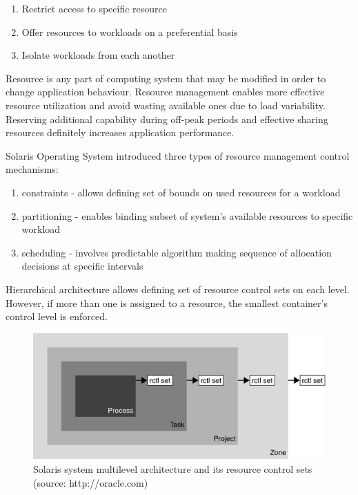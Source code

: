 \documentclass[11pt]{book}
\begin{document}
      \begin{enumerate}
        \item Restrict access to specific resource
        \item Offer resources to workloads on a preferential basis
        \item Isolate workloads from each another
      \end{enumerate}
	
      Resource is any part of computing system that may be modified in order to change application behaviour. Resource
      management enables more effective resource utilization and avoid wasting available ones due to load variability.
      Reserving additional capability during off-peak periods and effective sharing resources definitely increases
      application performance.
      
      Solaris Operating System introduced three types of resource management control mechanisms:

      \begin{enumerate}
        \item constraints - allows defining set of bounds on used resources for a workload
        \item partitioning - enables binding subset of system's available resources to specific workload
        \item scheduling - involves predictable algorithm making sequence of allocation decisions at specific intervals
      \end{enumerate}

      Hierarchical architecture allows defining set of resource control sets on each level. However, if more than one is
      assigned to a resource, the smallest container's control level is enforced. 

      \begin{figure}[H]
        \includegraphics[width=\textwidth]{img/rctrl.png}
        \caption{Solaris system multilevel architecture and its resource control sets (source: http://oracle.com)}
		  \end{figure}
                
\end{document}

